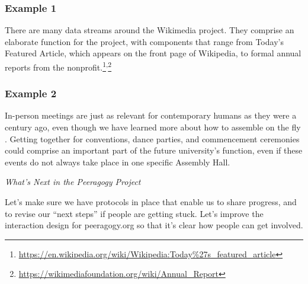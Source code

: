 \subsubsection*{Example 1} 
There are many data streams around the Wikimedia project.  They comprise an elaborate  function for the project, with components that range from Today's Featured Article, which appears on the front page of Wikipedia, to formal annual reports from the nonprofit.\footnote{\url{https://en.wikipedia.org/wiki/Wikipedia:Today\%27s_featured_article}}\textsuperscript{,}\footnote{\url{https://wikimediafoundation.org/wiki/Annual_Report}}


\subsubsection*{Example 2} In-person meetings are just as relevant for contemporary humans as they were a century ago, even though we have learned more about how to assemble on the fly \cite{rheingold2007smart}.  Getting together for conventions, dance parties, and commencement ceremonies could comprise an important part of the future university's  function, even if these events do not always take place in one specific Assembly Hall.


\begin{framed}
\noindent 
\emph{What's Next in the Peeragogy Project}
\begin{collectinmacro}{\WrapperWN}{}{}
Let's make sure we have protocols in place that enable us to share
progress, and to revise our ``next steps'' if people are getting
stuck.  Let's improve the interaction design for peeragogy.org so that
it's clear how people can get involved.
\end{collectinmacro}
\WrapperWN
\end{framed}


